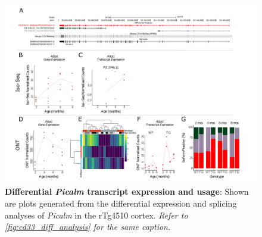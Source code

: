 \begin{landscape}
	\begin{figure}[htp]
		\begin{center}
			\includegraphics[page=12,trim={0 0.5cm 0 1.5cm},scale =0.85]{Figures/TargetGene_DifferentialAnalysis.pdf}
		\end{center}
		\captionsetup{width=1.5\textwidth}
		\caption[Differential \textit{Picalm} transcript expression and usage]%
		{\textbf{Differential \textit{Picalm} transcript expression and usage}: Shown are plots generated from the differential expression and splicing analyses of \textit{Picalm} in the rTg4510 cortex. \textit{Refer to \cref{fig:cd33_diff_analysis} for the same caption.}}   
		\label{fig:Picalm_diff_analysis}
	\end{figure}
\end{landscape}

